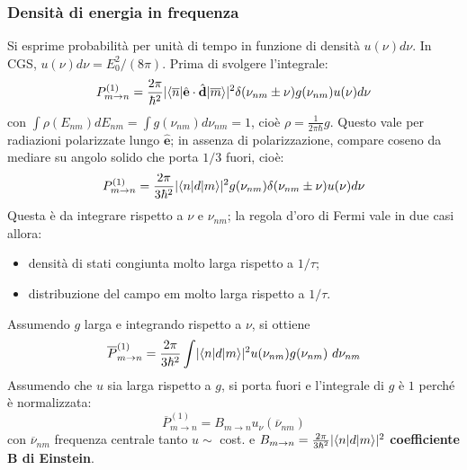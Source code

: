 \documentclass[10pt, a4paper]{scrartcl}
\numberwithin{equation}{subsection}
\theoremstyle{style1}
\theoremstyle{style2}
\begin{document}
\subsubsection{Densit\`a di energia in frequenza}
Si esprime probabilit\`a per unit\`a di tempo in funzione di densit\`a $u(\nu ) d\nu $. In CGS, $u(\nu ) d\nu  = E_0^2 / (8\pi)$. Prima di svolgere l'integrale:
\begin{equation}
	P^{(1)} _{m\to n}  = \frac{2\pi}{\hbar ^2} \lvert \braket{\overline{n}|\hat{\mathbf{e}}\cdot \hat{\mathbf{d} }|\overline{m}}  \rvert ^2 \delta (\nu _{nm} \pm\nu ) g(\nu _{nm} )u (\nu ) d\nu 
\end{equation}
con $\int \rho (E_{nm} ) dE_{nm} = \int g(\nu _{nm} ) d\nu _{nm}  = 1 $, cio\`e $\rho = \frac{1}{2\pi \hbar }g$. 
Questo vale per radiazioni polarizzate lungo $\hat{\mathbf{e} }$; in assenza di polarizzazione, compare coseno da mediare su angolo solido che porta $1 /3 $ fuori, cio\`e:
\begin{equation}
	P^{(1)} _{m\to n} = \frac{2\pi}{3 \hbar ^2}\lvert \braket{n|d|m}  \rvert ^2 g(\nu _{nm} ) \delta (\nu _{nm} \pm\nu ) u(\nu ) d\nu 
\end{equation}
Questa \`e da integrare rispetto a $\nu $ e $\nu _{nm} $; la regola d'oro di Fermi vale in due casi allora:
\begin{itemize}
	\item densit\`a di stati congiunta molto larga rispetto a $1 / \tau $;
	\item distribuzione del campo em molto larga rispetto a $1 / \tau $.
\end{itemize}
Assumendo $g$ larga e integrando rispetto a $\nu $, si ottiene
\[
\overline{P}^{(1)} _{m\to n}  = \frac{2\pi}{3\hbar ^2}\int \lvert \braket{n|d|m}  \rvert ^2 u(\nu _{nm} ) g(\nu _{nm} )\ d \nu _{nm} 
\] 
Assumendo che $u$ sia larga rispetto a $g$, si porta fuori e l'integrale di $g$ \`e $1$ perch\'e \`e normalizzata:
\begin{equation}
	\overline{P}^{(1)} _{m\to n} = B_{m\to n} u_{\nu } (\overline{\nu }_{nm} )
\end{equation}
con $\overline{\nu }_{nm} $ frequenza centrale tanto $u\sim$ cost. e $B_{m\to n} = \frac{2\pi}{3\hbar ^2}\lvert \braket{n|d|m}  \rvert ^2$ \textbf{coefficiente B di Einstein}.
\end{document}
